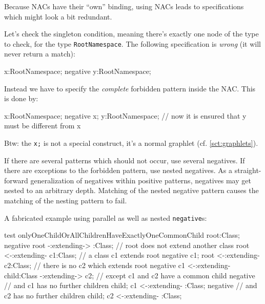 Because NACs have their ``own'' binding, using NACs leads to specifications which might look a bit redundant.

  \begin{example}
    Let's check the singleton condition, meaning there's exactly one node of the type to check, for the type \texttt{RootNamespace}.
    The following specification is \emph{wrong} (it will never return a match):
    \begin{grgen}
  x:RootNamespace;
  negative {
    y:RootNamespace;
  }
    \end{grgen}
	
    Instead we have to specify the \emph{complete} forbidden pattern inside the NAC. This is done by:
    
	\begin{grgen}
  x:RootNamespace;
  negative {
    x;
    y:RootNamespace; // now it is ensured that y must be different from x
  }
    \end{grgen}
	
	Btw: the \texttt{x;} is not a special construct, it's a normal graphlet (cf. \ref{sct:graphlets}).
	
  \end{example} 

If there are several patterns which should not occur, use several negatives.
If there are exceptions to the forbidden pattern, use nested negatives.
As a straight-forward generalization of negatives within positive patterns, negatives may get nested to an arbitrary depth.
Matching of the nested negative pattern causes the matching of the nesting pattern to fail.

\begin{example}
  A fabricated example using parallel as well as nested \texttt{negative}s:
  \begin{grgen}
test onlyOneChildOrAllChildrenHaveExactlyOneCommonChild
{
  root:Class;
  negative {
    root -:extending-> :Class; // root does not extend another class
  }
  root <-:extending- c1:Class; // a class c1 extends root
  negative {
    c1;
    root <-:extending- c2:Class; // there is no c2 which extends root
    negative {
      c1 <-:extending- child:Class -:extending-> c2; // except c1 and c2 have a common child
      negative { // and c1 has no further children
        child;
        c1 <-:extending- :Class;
      }
      negative { // and c2 has no further children
        child;
        c2 <-:extending- :Class; 
      }
    }
  }
}
  \end{grgen}
\end{example}

